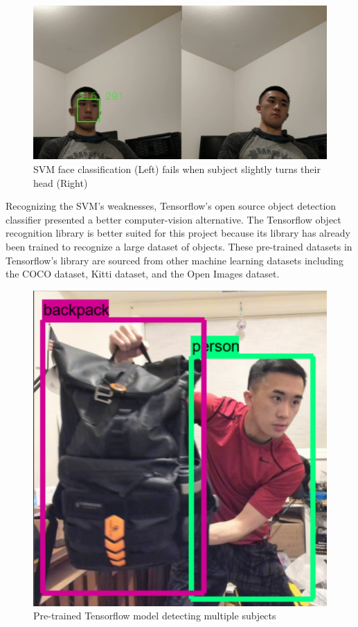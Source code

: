 \documentclass[onecolumn, draftclsnofoot,10pt, compsoc]{IEEEtran}
\makeatletter
\newcommand\captionof[1]{\def\@captype{#1}\caption}
\makeatother
\begin{document}
\begin{singlespace}
			\begin{figure}[H]
			\includegraphics[scale=0.75]{svm.PNG}
			\captionof{figure}{SVM face classification (Left) fails when subject slightly turns their head (Right)}
			\label{svm}
			\end{figure}


			Recognizing the SVM's weaknesses, Tensorflow's open source object detection classifier presented a better computer-vision alternative. \cite{tensorflow}
			The Tensorflow object recognition library is better suited for this project because its library has already been trained to recognize a large dataset of objects. \cite{convolutional_object_detectors}
			These pre-trained datasets in Tensorflow's library are sourced from other machine learning datasets including the COCO dataset, Kitti dataset, and the Open Images dataset. \cite{coco} \cite{open_images} \cite{kitti}


			\begin{figure}[H]
			\includegraphics[scale=0.5]{tensorflow.PNG}
			\captionof{figure}{Pre-trained Tensorflow model detecting multiple subjects}
			\label{tf-detect}
			\end{figure}



\end{singlespace}
\end{document}
